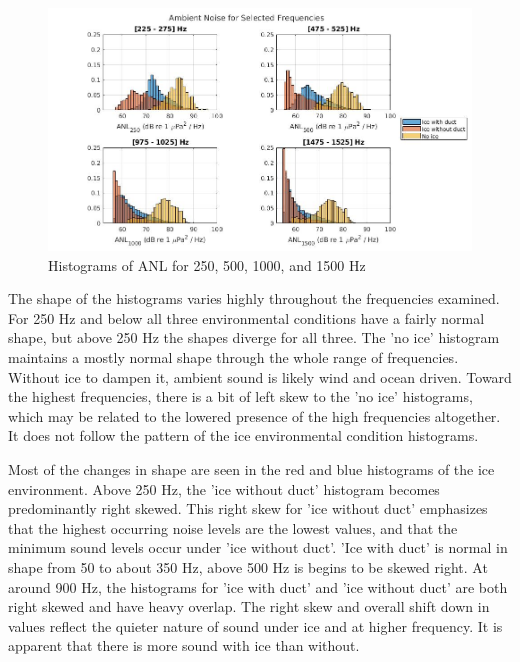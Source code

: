 \begin{figure}[h]
\centering
\includegraphics[scale=0.45]{Figures/selected_hists.jpg}
\caption{Histograms of ANL for 250, 500, 1000, and 1500 Hz}
\label{fig_selhist}
\end{figure}

The shape of the histograms varies highly throughout the frequencies examined. For 250 Hz and below all three environmental conditions have a fairly normal shape, but above 250 Hz the shapes diverge for all three. The 'no ice' histogram maintains a mostly normal shape through the whole range of frequencies. Without ice to dampen it, ambient sound is likely wind and ocean driven. Toward the highest frequencies, there is a bit of left skew to the 'no ice' histograms, which may be related to the lowered presence of the high frequencies altogether. It does not follow the pattern of the ice environmental condition histograms.

Most of the changes in shape are seen in the red and blue histograms of the ice environment. Above 250 Hz, the 'ice without duct' histogram becomes predominantly right skewed. This right skew for 'ice without duct' emphasizes that the highest occurring noise levels are the lowest values, and that the minimum sound levels occur under 'ice without duct'.  'Ice with duct' is normal in shape from 50 to about 350 Hz, above 500 Hz is begins to be skewed right. At around 900 Hz, the histograms for 'ice with duct' and 'ice without duct' are both right skewed and have heavy overlap. The right skew and overall shift down in values reflect the quieter nature of sound under ice and at higher frequency. It is apparent that there is more sound with ice than without.




